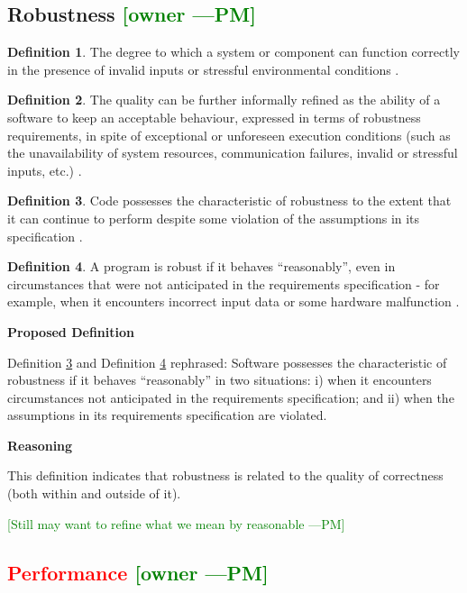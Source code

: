 \documentclass[letterpaper,cleveref]{lipics-v2019}
\newcommand{\authornote}[3]{\textcolor{#1}{[#3 ---#2]}}
\newcommand{\authornote}[3]{}
\newcommand{\pmi}[1]{\authornote{green}{PM}{#1}} %
\newcommand{\notdone}[1]{\textcolor{red}{#1}}
\theoremstyle{definition}
\newtheorem{defn}{Definition}
\begin{document}
\subsection{{Robustness} \pmi{owner}}
\begin{defn}
	The degree to which a system or component can function correctly in the
	presence of invalid inputs or stressful environmental conditions
	\citep{IEEEStdGlossarySET1990}.
\end{defn}
\begin{defn}
	The quality can be further informally refined as the ability of a software to
	keep an acceptable behaviour, expressed in terms of robustness requirements,
	in
	spite of exceptional or unforeseen execution conditions (such as the
	unavailability of system resources, communication failures, invalid or
	stressful inputs, etc.) \citep{fernandez2005model}.
\end{defn}
\begin{defn} \label{RobustnessPartialDefn}
	Code possesses the characteristic of robustness to the extent that it can
	continue to perform despite some violation of the assumptions in its
	specification \citep{boehm2007software}.
\end{defn}
\begin{defn} \label{RobustnessDefnSelected}
	A program is robust if it behaves ``reasonably'', even in circumstances that
	were not anticipated in the requirements specification - for example, when it
	encounters incorrect input data or some hardware malfunction
	\citep{ghezzi1991fundamentals}.
\end{defn}

\noindent \textbf{Proposed Definition}

Definition \ref{RobustnessPartialDefn} and Definition
\ref{RobustnessDefnSelected} rephrased: Software possesses the characteristic of
robustness if it behaves ``reasonably'' in two situations: i) when it encounters
circumstances not anticipated in the requirements specification; and ii) when
the assumptions in its requirements specification are violated.

\noindent \textbf{Reasoning}

This definition indicates that robustness is related to the quality of
correctness (both within and outside of it). 

\pmi{Still may want to refine what we mean by reasonable}

\subsection{\notdone{Performance} \pmi{owner}}
\end{document}
